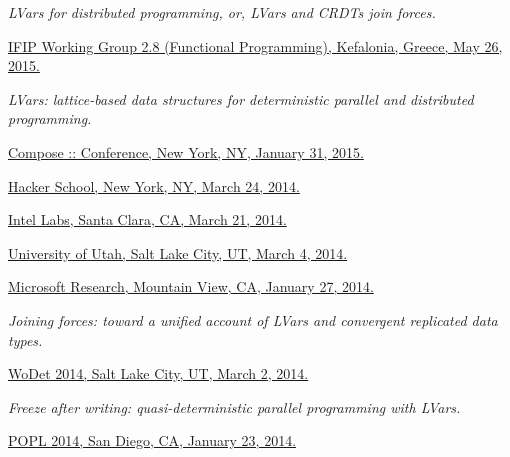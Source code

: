 \documentclass[10pt,letterpaper]{article}
\newenvironment{itemize*}
  {\begin{itemize}
      \setlength{\itemsep}{1pt}
      \setlength{\parskip}{3pt}
  }
  {\end{itemize}}
\begin{document}
\begin{itemize*}
\item
  \emph{LVars for distributed programming, or, LVars and CRDTs join forces.}
  \begin{itemize*}
  \item
    \href{http://www.cs.indiana.edu/~lkuper/talks/monotonic-determinism/wg28-may-2015.pdf}{IFIP Working Group 2.8 (Functional Programming), Kefalonia, Greece, May 26, 2015.}
  \end{itemize*}
\item
  \emph{LVars: lattice-based data structures for deterministic
    parallel and distributed programming.}
  \begin{itemize*}
  \item
    \href{http://www.cs.indiana.edu/~lkuper/talks/monotonic-determinism/compose-2015.pdf}{Compose :: Conference, New York, NY, January 31, 2015.}
  \item
    \href{http://www.cs.indiana.edu/~lkuper/talks/monotonic-determinism/hacker-school-march-2014.pdf}{Hacker
      School, New York, NY, March 24, 2014.}
  \item
    \href{http://www.cs.indiana.edu/~lkuper/talks/monotonic-determinism/intel-labs-march-2014.pdf}{Intel
      Labs, Santa Clara, CA, March 21, 2014.}
  \item
    \href{http://www.cs.indiana.edu/~lkuper/talks/monotonic-determinism/utah-march-2014.pdf}{University
      of Utah, Salt Lake City, UT, March 4, 2014.}
  \item
    \href{http://www.cs.indiana.edu/~lkuper/talks/monotonic-determinism/msr-january-2014.pdf}{Microsoft
      Research, Mountain View, CA, January 27, 2014.}
  \end{itemize*}

\item
  \emph{Joining forces: toward a unified account of LVars and convergent replicated data types.}
  \begin{itemize*}
  \item
    \href{http://www.cs.indiana.edu/~lkuper/talks/monotonic-determinism/wodet-march-2014.pdf}{WoDet
      2014, Salt Lake City, UT, March 2, 2014.}
  \end{itemize*}

\item
  \emph{Freeze after writing: quasi-deterministic parallel programming
    with LVars.}
  \begin{itemize*}
  \item
    \href{http://www.cs.indiana.edu/~lkuper/talks/monotonic-determinism/lvish-popl-2014.pdf}{POPL
      2014, San Diego, CA, January 23, 2014.}
  \end{itemize*}


\end{itemize*}
\end{document}
